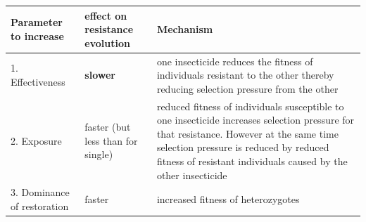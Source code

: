 \documentclass[11pt,]{article}
\begin{document}
\begin{longtable}[]{@{}lll@{}}
\toprule
\begin{minipage}[b]{0.27\columnwidth}\raggedright\strut
Parameter to increase\strut
\end{minipage} & \begin{minipage}[b]{0.12\columnwidth}\raggedright\strut
effect on resistance evolution\strut
\end{minipage} & \begin{minipage}[b]{0.52\columnwidth}\raggedright\strut
Mechanism\strut
\end{minipage}\tabularnewline
\midrule
\endhead
\begin{minipage}[t]{0.27\columnwidth}\raggedright\strut
1. Effectiveness\strut
\end{minipage} & \begin{minipage}[t]{0.12\columnwidth}\raggedright\strut
\textbf{slower}\strut
\end{minipage} & \begin{minipage}[t]{0.52\columnwidth}\raggedright\strut
one insecticide reduces the fitness of individuals resistant to the
other thereby reducing selection pressure from the other\strut
\end{minipage}\tabularnewline
\begin{minipage}[t]{0.27\columnwidth}\raggedright\strut
2. Exposure\strut
\end{minipage} & \begin{minipage}[t]{0.12\columnwidth}\raggedright\strut
faster (but less than for single)\strut
\end{minipage} & \begin{minipage}[t]{0.52\columnwidth}\raggedright\strut
reduced fitness of individuals susceptible to one insecticide increases
selection pressure for that resistance. However at the same time
selection pressure is reduced by reduced fitness of resistant
individuals caused by the other insecticide\strut
\end{minipage}\tabularnewline
\begin{minipage}[t]{0.27\columnwidth}\raggedright\strut
3. Dominance of restoration\strut
\end{minipage} & \begin{minipage}[t]{0.12\columnwidth}\raggedright\strut
faster\strut
\end{minipage} & \begin{minipage}[t]{0.52\columnwidth}\raggedright\strut
increased fitness of heterozygotes\strut
\end{minipage}\tabularnewline

\end{longtable}
\end{document}
